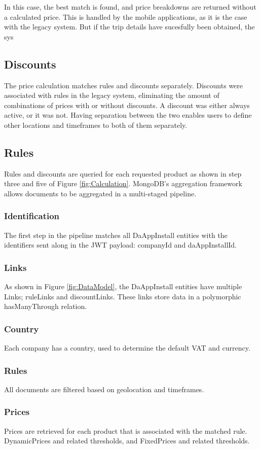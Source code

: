 In this case, the best match is found, and price breakdowns are returned without a calculated price. This is handled by the mobile applications, as it is the case with the legacy system. But if the trip details have sucesfully been obtained, the sys

\subsection{Discounts}
The price calculation matches rules and discounts separately. Discounts were associated with rules in the legacy system, eliminating the amount of combinations of prices with or without discounts. A discount was either always active, or it was not. Having separation between the two enables users to define other locations and timeframes to both of them separately.

\subsection{Rules}
Rules and discounts are queried for each requested product as shown in step three and five of Figure \ref{fig:Calculation}. MongoDB’s aggregation framework allows documents to be aggregated in a multi-staged pipeline.

\subsubsection{Identification}
The first step in the pipeline matches all DaAppInstall entities with the identifiers sent along in the JWT payload: companyId and daAppInstallId.
\subsubsection{Links}
As shown in Figure \ref{fig:DataModel}, the DaAppInstall entities have multiple Links; ruleLinks and discountLinks. These links store data in a polymorphic hasManyThrough relation.
\subsubsection{Country}
Each company has a country, used to determine the default VAT and currency.
\subsubsection{Rules}
All documents are filtered based on geolocation and timeframes.
\subsubsection{Prices}
Prices are retrieved for each product that is associated with the matched rule. DynamicPrices and related thresholds, and FixedPrices and related thresholds.
